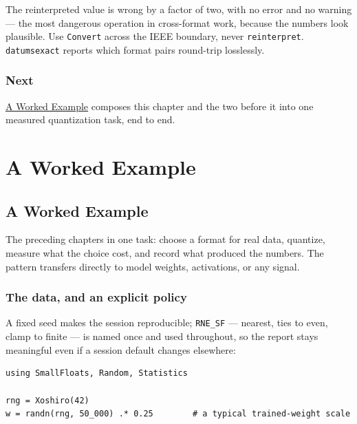 The reinterpreted value is wrong by a factor of two, with no error and no warning — the most dangerous operation in cross-format work, because the numbers look plausible. Use \texttt{Convert} across the IEEE boundary, never \texttt{reinterpret}. \texttt{datumsexact} reports which format pairs round-trip losslessly.



\section{Next}



\label{9862256287407127426}{}


\href{worked\_example.md}{A Worked Example} composes this chapter and the two before it into one measured quantization task, end to end.



\part{A Worked Example}


\chapter{A Worked Example}



\label{15995443143905973460}{}


The preceding chapters in one task: choose a format for real data, quantize, measure what the choice cost, and record what produced the numbers. The pattern transfers directly to model weights, activations, or any signal.



\section{The data, and an explicit policy}



\label{11636787435248503912}{}


A fixed seed makes the session reproducible; \texttt{RNE\_SF} — nearest, ties to even, clamp to finite — is named once and used throughout, so the report stays meaningful even if a session default changes elsewhere:




\begin{verbatim}
using SmallFloats, Random, Statistics

rng = Xoshiro(42)
w = randn(rng, 50_000) .* 0.25        # a typical trained-weight scale
\end{verbatim}



